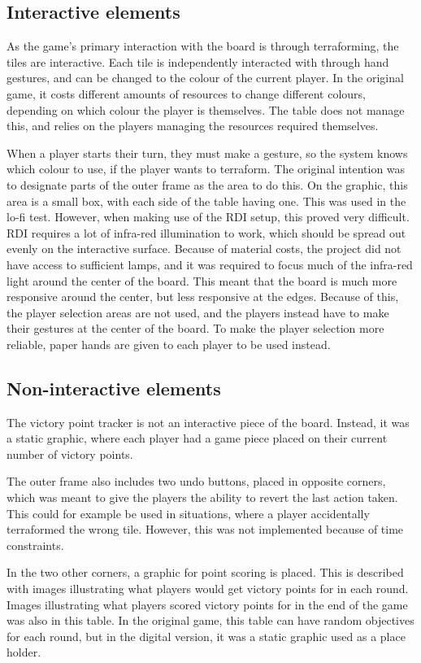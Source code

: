 \subsection{Interactive elements}
As the game's primary interaction with the board is through terraforming, the tiles are interactive. Each tile is independently interacted with through hand gestures, and can be changed to the colour of the current player. In the original game, it costs different amounts of resources to change different colours, depending on which colour the player is themselves. The table does not manage this, and relies on the players managing the resources required themselves.

When a player starts their turn, they must make a gesture, so the system knows which colour to use, if the player wants to terraform. The original intention was to designate parts of the outer frame as the area to do this. On the graphic, this area is a small box, with each side of the table having one. This was used in the lo-fi test. However, when making use of the RDI setup, this proved very difficult. RDI requires a lot of infra-red illumination to work, which should be spread out evenly on the interactive surface. Because of material costs, the project did not have access to sufficient lamps, and it was required to focus much of the infra-red light around the center of the board. This meant that the board is much more responsive around the center, but less responsive at the edges. Because of this, the player selection areas are not used, and the players instead have to make their gestures at the center of the board. To make the player selection more reliable, paper hands are given to each player to be used instead. 

\subsection{Non-interactive elements}
The victory point tracker is not an interactive piece of the board. Instead, it was a static graphic, where each player had a game piece placed on their current number of victory points.

The outer frame also includes two undo buttons, placed in opposite corners, which was meant to give the players the ability to revert the last action taken. This could for example be used in situations, where a player accidentally terraformed the wrong tile. However, this was not implemented because of time constraints.

In the two other corners, a graphic for point scoring is placed. This is described with images illustrating what players would get victory points for in each round. Images illustrating what players scored victory points for in the end of the game was also in this table. In the original game, this table can have random objectives for each round, but in the digital version, it was a static graphic used as a place holder.